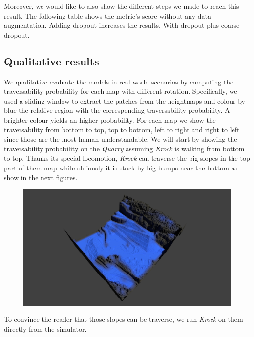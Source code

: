 \documentclass[../document.tex]{subfiles}
\begin{document}
Moreover, we would like to also show the different steps we made to reach this result. The following table shows the metric's score without any data-augmentation.
Adding dropout increases the results.
With dropout plus coarse dropout.
\subsection{Qualitative results}
We qualitative evaluate the models in real world scenarios by computing the traversability probability for each map with different rotation. Specifically, we used a sliding window to extract the patches from the heightmaps and colour by blue the relative region with the corresponding traversability probability. A brighter colour yields an higher probability. For each map we show the traversability from bottom to top, top to bottom, left to right and right to left since those are the most human understandable.
We will start by showing the traversability probability on the \emph{Quarry} assuming \emph{Krock} is walking from bottom to top.
Thanks its special locomotion, \emph{Krock} can traverse the big slopes in the top part of them map while obliously it is stock by big bumps near the bottom as show in the next figures.
\begin{figure}[H]
\centering
\includegraphics[width=\linewidth]{../img/4/traversability/quarry/querry-big-10-270.png}
\end{figure}
To convince the reader that those slopes can be traverse, we run \emph{Krock} on them directly from the simulator.
\end{document}
